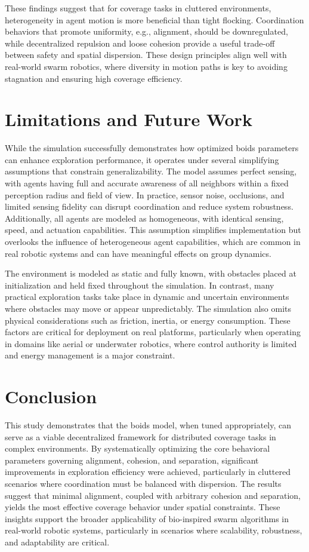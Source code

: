 \documentclass[12pt]{article}
\begin{document}
\begin{linenumbers}
These findings suggest that for coverage tasks in cluttered environments, heterogeneity in agent motion is more beneficial than tight flocking. Coordination behaviors that promote uniformity, e.g., alignment, should be downregulated, while decentralized repulsion and loose cohesion provide a useful trade-off between safety and spatial dispersion. These design principles align well with real-world swarm robotics, where diversity in motion paths is key to avoiding stagnation and ensuring high coverage efficiency.

\section{Limitations and Future Work}

\sloppypar
While the simulation successfully demonstrates how optimized boids parameters can enhance exploration performance, it operates under several simplifying assumptions that constrain generalizability. The model assumes perfect sensing, with agents having full and accurate awareness of all neighbors within a fixed perception radius and field of view. In practice, sensor noise, occlusions, and limited sensing fidelity can disrupt coordination and reduce system robustness. Additionally, all agents are modeled as homogeneous, with identical sensing, speed, and actuation capabilities. This assumption simplifies implementation but overlooks the influence of heterogeneous agent capabilities, which are common in real robotic systems and can have meaningful effects on group dynamics.

The environment is modeled as static and fully known, with obstacles placed at initialization and held fixed throughout the simulation. In contrast, many practical exploration tasks take place in dynamic and uncertain environments where obstacles may move or appear unpredictably. The simulation also omits physical considerations such as friction, inertia, or energy consumption. These factors are critical for deployment on real platforms, particularly when operating in domains like aerial or underwater robotics, where control authority is limited and energy management is a major constraint.

\section{Conclusion}

This study demonstrates that the boids model, when tuned appropriately, can serve as a viable decentralized framework for distributed coverage tasks in complex environments. By systematically optimizing the core behavioral parameters governing alignment, cohesion, and separation, significant improvements in exploration efficiency were achieved, particularly in cluttered scenarios where coordination must be balanced with dispersion. The results suggest that minimal alignment, coupled with arbitrary cohesion and separation, yields the most effective coverage behavior under spatial constraints. These insights support the broader applicability of bio-inspired swarm algorithms in real-world robotic systems, particularly in scenarios where scalability, robustness, and adaptability are critical.



\end{linenumbers}

\appendix
\end{document}

